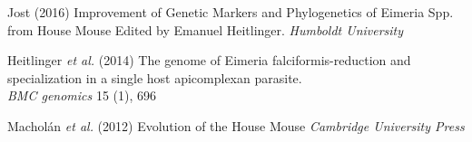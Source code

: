 \documentclass[30pt, a0paper, portrait, margin=0mm, innermargin=15mm,
               blockverticalspace=15mm, colspace=15mm, subcolspace=8mm]{tikzposter}
\begin{document}
\begin{columns}
{\begin{small}
          \hangindent=2cm Jost (2016) Improvement of Genetic Markers and Phylogenetics of Eimeria Spp. from House Mouse
          Edited by Emanuel Heitlinger. \textit{Humboldt University}

          \hangindent=2cm Heitlinger \textit{et al.} (2014) The genome of Eimeria falciformis-reduction and specialization in a single host apicomplexan         parasite.\\ \textit{BMC genomics} 15 (1), 696
                    
          \hangindent=2cm Machol\'{a}n \textit{et al.} (2012) Evolution of the House Mouse
          \textit{Cambridge University Press}
          
        
          
        \end{small}
      }



\end{columns}



\end{document}
